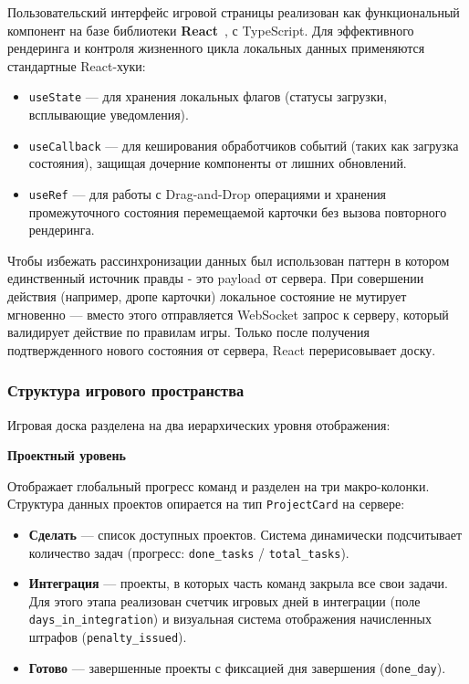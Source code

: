 Пользовательский интерфейс игровой страницы реализован как функциональный компонент на базе библиотеки \textbf{React}~\cite{react-arch}, с TypeScript. Для эффективного рендеринга и контроля жизненного цикла локальных данных применяются стандартные React-хуки:
\begin{itemize}
    \item \texttt{useState} — для хранения локальных флагов (статусы загрузки, всплывающие уведомления).
    \item \texttt{useCallback} — для кеширования обработчиков событий (таких как загрузка состояния), защищая дочерние компоненты от лишних обновлений.
    \item \texttt{useRef} — для работы с Drag-and-Drop операциями и хранения промежуточного состояния перемещаемой карточки без вызова повторного рендеринга.
\end{itemize}

Чтобы избежать рассинхронизации данных был использован паттерн в котором единственный источник правды - это payload от сервера. При совершении действия (например, дропе карточки) локальное состояние не мутирует мгновенно — вместо этого отправляется WebSocket запрос к серверу, который валидирует действие по правилам игры. Только после получения подтвержденного нового состояния от сервера, React перерисовывает доску.

\subsubsection{Структура игрового пространства}

Игровая доска разделена на два иерархических уровня отображения:

\textbf{Проектный уровень}

Отображает глобальный прогресс команд и разделен на три макро-колонки. Структура данных проектов опирается на тип \texttt{ProjectCard} на сервере:
\begin{itemize}
    \item \textbf{Сделать} — список доступных проектов. Система динамически подсчитывает количество задач (прогресс: \texttt{done\_tasks} / \texttt{total\_tasks}).
    \item \textbf{Интеграция} — проекты, в которых часть команд закрыла все свои задачи. Для этого этапа реализован счетчик игровых дней в интеграции (поле \texttt{days\_in\_integration}) и визуальная система отображения начисленных штрафов (\texttt{penalty\_issued}).
    \item \textbf{Готово} — завершенные проекты с фиксацией дня завершения (\texttt{done\_day}).
\end{itemize}

